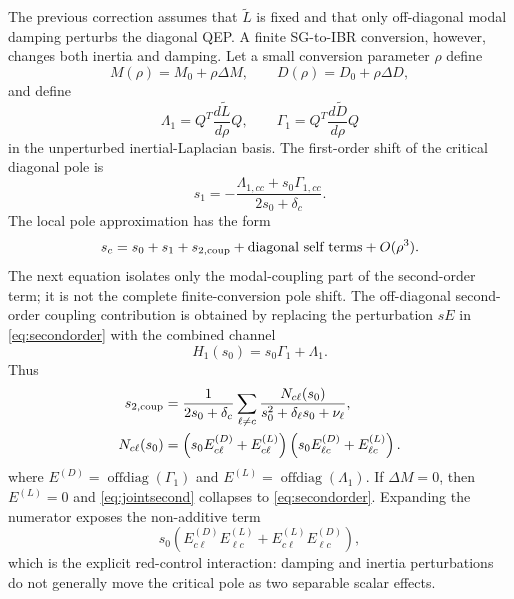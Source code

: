 \documentclass[journal]{IEEEtran}
\newcommand{\Lt}{\widetilde L}
\newcommand{\Dt}{\widetilde D}
\begin{document}
The previous correction assumes that $\Lt$ is fixed and that only off-diagonal modal damping perturbs the diagonal QEP. A finite SG-to-IBR conversion, however, changes both inertia and damping. Let a small conversion parameter $\rho$ define
\begin{equation}
M(\rho)=M_0+\rho\Delta M,\qquad
D(\rho)=D_0+\rho\Delta D,
\end{equation}
and define
\begin{equation}
\Lambda_1=Q^T\frac{d\Lt}{d\rho}Q,\qquad
\Gamma_1=Q^T\frac{d\Dt}{d\rho}Q
\end{equation}
in the unperturbed inertial-Laplacian basis. The first-order shift of the critical diagonal pole is
\begin{equation}
s_1=-\frac{\Lambda_{1,cc}+s_0\Gamma_{1,cc}}{2s_0+\delta_c}.
\label{eq:jointfirst}
\end{equation}
The local pole approximation has the form
\begin{equation}
s_c=s_0+s_1+s_{2,{\rm coup}}+\hbox{diagonal self terms}+O(\rho^3).
\end{equation}
The next equation isolates only the modal-coupling part of the second-order term; it is not the complete finite-conversion pole shift.
The off-diagonal second-order coupling contribution is obtained by replacing the perturbation $sE$ in \eqref{eq:secondorder} with the combined channel
\begin{equation}
H_1(s_0)=s_0\Gamma_1+\Lambda_1.
\end{equation}
Thus
\begin{align}
s_{2,{\rm coup}}
&=\frac{1}{2s_0+\delta_c}
\sum_{\ell\neq c}
\frac{N_{c\ell}(s_0)}
{s_0^2+\delta_\ell s_0+\nu_\ell},
\label{eq:jointsecond}\\
N_{c\ell}(s_0)
&=\left(s_0E^{(D)}_{c\ell}+E^{(L)}_{c\ell}\right)
\left(s_0E^{(D)}_{\ell c}+E^{(L)}_{\ell c}\right).
\end{align}
where $E^{(D)}=\operatorname{offdiag}(\Gamma_1)$ and
$E^{(L)}=\operatorname{offdiag}(\Lambda_1)$. If $\Delta M=0$, then
$E^{(L)}=0$ and \eqref{eq:jointsecond} collapses to \eqref{eq:secondorder}. Expanding the numerator exposes the non-additive term
\begin{equation}
s_0\left(
E^{(D)}_{c\ell}E^{(L)}_{\ell c}
+E^{(L)}_{c\ell}E^{(D)}_{\ell c}
\right),
\label{eq:cross}
\end{equation}
which is the explicit red-control interaction: damping and inertia perturbations do not generally move the critical pole as two separable scalar effects.
\end{document}
